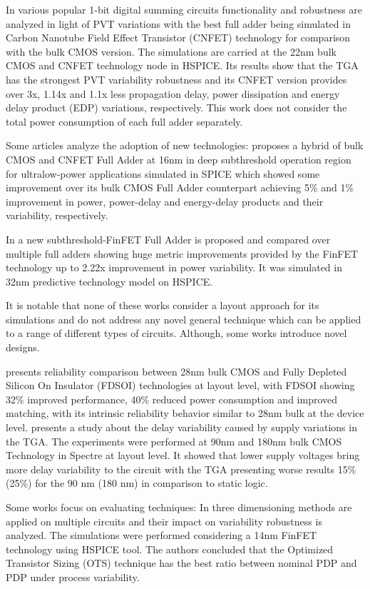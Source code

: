 \documentclass[ecp,tc, english]{iiufrgs}
\begin{document}
In \cite{islam2011design} various popular 1-bit digital summing circuits functionality and robustness are analyzed in light of PVT variations with the best full adder being simulated in Carbon Nanotube Field Effect Transistor (CNFET) technology for comparison with the bulk CMOS version. The simulations are carried at the 22nm bulk CMOS and CNFET technology node in HSPICE. Its results show that the TGA has the strongest PVT variability robustness and its CNFET version provides over 3x, 1.14x and 1.1x less propagation delay, power dissipation and energy delay product (EDP) variations, respectively. This work does not consider the total power consumption of each full adder separately.

Some articles analyze the adoption of new technologies: \cite{guduri2015design} proposes a hybrid of bulk CMOS and CNFET Full Adder at 16nm in deep subthreshold operation region for ultralow-power applications simulated in SPICE which showed some improvement over its bulk CMOS Full Adder counterpart achieving 5\% and 1\% improvement in power, power-delay and energy-delay products and their variability, respectively.  

In \cite{islam2011variability} a new subthreshold-FinFET Full Adder is proposed and compared over multiple full adders showing huge metric improvements provided by the FinFET technology up to 2.22x improvement in power variability. It was simulated in 32nm predictive technology model on HSPICE. 

It is notable that none of these works consider a layout approach for its simulations and do not address any novel general technique which can be applied to a range of different types of circuits. Although, some works introduce novel designs.

\cite{federspiel201228nm} presents reliability comparison between 28nm bulk CMOS and Fully Depleted Silicon On Insulator (FDSOI) technologies at layout level, with FDSOI showing 32\% improved performance, 40\% reduced power consumption and improved matching, with its intrinsic reliability behavior similar to 28nm bulk at the device level. \cite{alioto2007delay} presents a study about the delay variability caused by supply variations in the TGA. The experiments were performed at 90nm and 180nm bulk CMOS Technology in Spectre at layout level. It showed that lower supply voltages bring more delay variability to the circuit with the TGA presenting worse results 15\% (25\%) for the 90 nm (180 nm) in comparison to static logic.

Some works focus on evaluating techniques: In \cite{zimpeck2016finfet} three dimensioning methods are applied on multiple circuits and their impact on variability robustness is analyzed. The simulations were performed considering a 14nm FinFET technology using HSPICE tool. The authors concluded that the Optimized Transistor Sizing (OTS) technique has the best ratio between nominal PDP and PDP under process variability.
\end{document}

